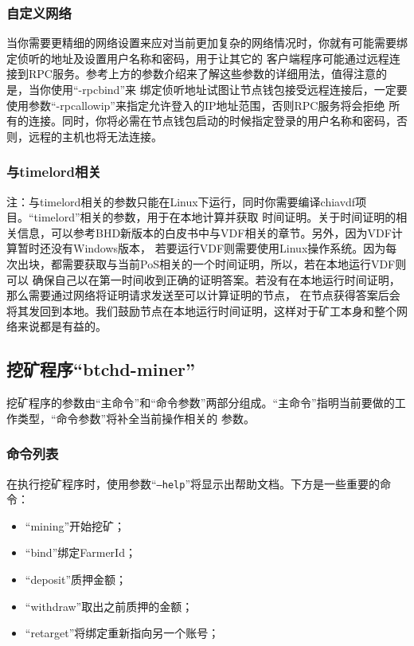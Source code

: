 \subsubsection{自定义网络}
\begin{flushleft}
    当你需要更精细的网络设置来应对当前更加复杂的网络情况时，你就有可能需要绑定侦听的地址及设置用户名称和密码，用于让其它的
    客户端程序可能通过远程连接到RPC服务。参考上方的参数介绍来了解这些参数的详细用法，值得注意的是，当你使用``-rpcbind''来
    绑定侦听地址试图让节点钱包接受远程连接后，一定要使用参数``-rpcallowip''来指定允许登入的IP地址范围，否则RPC服务将会拒绝
    所有的连接。同时，你将必需在节点钱包启动的时候指定登录的用户名称和密码，否则，远程的主机也将无法连接。
\end{flushleft}
\subsubsection{与timelord相关}
\begin{flushleft}
    注：与timelord相关的参数只能在Linux下运行，同时你需要编译chiavdf项目。``timelord''相关的参数，用于在本地计算并获取
    时间证明。关于时间证明的相关信息，可以参考BHD新版本的白皮书中与VDF相关的章节。另外，因为VDF计算暂时还没有Windows版本，
    若要运行VDF则需要使用Linux操作系统。因为每次出块，都需要获取与当前PoS相关的一个时间证明，所以，若在本地运行VDF则可以
    确保自己以在第一时间收到正确的证明答案。若没有在本地运行时间证明，那么需要通过网络将证明请求发送至可以计算证明的节点，
    在节点获得答案后会将其发回到本地。我们鼓励节点在本地运行时间证明，这样对于矿工本身和整个网络来说都是有益的。
\end{flushleft}
\subsection{挖矿程序``btchd-miner''}
\begin{flushleft}
    挖矿程序的参数由``主命令''和``命令参数''两部分组成。``主命令''指明当前要做的工作类型，``命令参数''将补全当前操作相关的
    参数。
\end{flushleft}
\subsubsection{命令列表}
\begin{flushleft}
    在执行挖矿程序时，使用参数``\texttt{--help}''将显示出帮助文档。下方是一些重要的命令：
\end{flushleft}
\begin{itemize}
    \item ``mining''开始挖矿；
    \item ``bind''绑定FarmerId；
    \item ``deposit''质押金额；
    \item ``withdraw''取出之前质押的金额；
    \item ``retarget''将绑定重新指向另一个账号；
\end{itemize}
